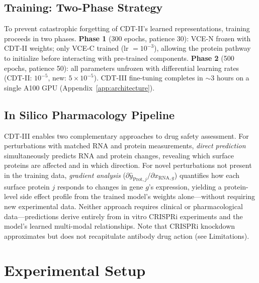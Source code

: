 \documentclass{article}
\begin{document}
\subsection{Training: Two-Phase Strategy}

To prevent catastrophic forgetting of CDT-II's learned representations, training proceeds in two phases.
\textbf{Phase 1} (300 epochs, patience 30): VCE-N frozen with CDT-II weights; only VCE-C trained (lr $= 10^{-3}$), allowing the protein pathway to initialize before interacting with pre-trained components.
\textbf{Phase 2} (500 epochs, patience 50): all parameters unfrozen with differential learning rates (CDT-II: $10^{-5}$, new: $5 \times 10^{-5}$).
CDT-III fine-tuning completes in $\sim$3 hours on a single A100 GPU (Appendix~\ref{app:architecture}).

\subsection{In Silico Pharmacology Pipeline}
\label{sec:pipeline}

CDT-III enables two complementary approaches to drug safety assessment. For perturbations with matched RNA and protein measurements, \textit{direct prediction} simultaneously predicts RNA and protein changes, revealing which surface proteins are affected and in which direction. For novel perturbations not present in the training data, \textit{gradient analysis} ($\partial \hat{y}_{\text{Prot},j} / \partial x_{\text{RNA},g}$) quantifies how each surface protein $j$ responds to changes in gene $g$'s expression, yielding a protein-level side effect profile from the trained model's weights alone---without requiring new experimental data. Neither approach requires clinical or pharmacological data---predictions derive entirely from in vitro CRISPRi experiments and the model's learned multi-modal relationships. Note that CRISPRi knockdown approximates but does not recapitulate antibody drug action (see Limitations).

\section{Experimental Setup}
\label{sec:setup}
\end{document}
